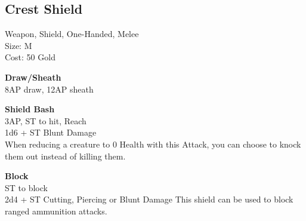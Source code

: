 \subsection{Crest Shield}\label{weapon:crestShield}
Weapon, Shield, One-Handed, Melee\\
Size: M\\
Cost: 50 Gold

\textbf{Draw/Sheath}\\
8AP draw, 12AP sheath

\textbf{Shield Bash}\\
3AP, ST to hit,  Reach\\
1d6 + \texttimes ST Blunt Damage\\
When reducing a creature to 0 Health with this Attack, you can choose to knock them out instead of killing them.

\textbf{Block}\\
ST to block\\
2d4 + \texttimes ST Cutting, Piercing or Blunt Damage
This shield can be used to block ranged ammunition attacks.\\

